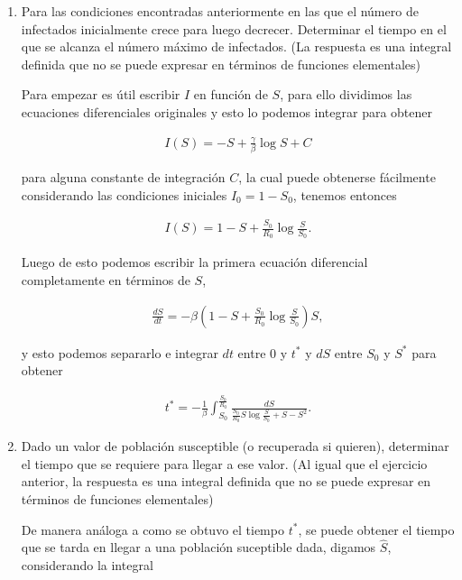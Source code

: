 \documentclass[answers]{exam}
\begin{document}
\begin{questions}
\begin{enumerate}
\begin{enumerate}
\item Para las condiciones encontradas anteriormente en las que el n\'umero de infectados inicialmente crece para luego decrecer. Determinar el tiempo en el que se alcanza el n\'umero m\'aximo de infectados. (La respuesta es una integral definida que no se puede expresar en t\'erminos de funciones elementales)

\begin{solution}
Para empezar es útil escribir $I$ en función de $S$, para ello dividimos las ecuaciones diferenciales originales y esto lo podemos integrar para obtener

\begin{align*}
    I(S) = -S + \frac{\gamma}{\beta}\log{S} + C
\end{align*}

para alguna constante de integración $C$, la cual puede obtenerse fácilmente considerando las condiciones iniciales $I_0 = 1 - S_0$, tenemos entonces

\begin{align*}
    I(S) = 1 - S + \frac{S_0}{R_0}\log{\frac{S}{S_0}}.
\end{align*}

Luego de esto podemos escribir la primera ecuación diferencial completamente en términos de $S$,

\begin{align*}
    \frac{dS}{dt} = -\beta\left(1 - S + \frac{S_0}{R_0}\log{\frac{S}{S_0}}\right)S,
\end{align*}

y esto podemos separarlo e integrar $dt$ entre $0$ y $t^*$ y $dS$ entre $S_0$ y $S^*$ para obtener

\begin{align*}
    t^* = -\frac{1}{\beta}\int_{S_0}^{\frac{S_0}{R_0}} \frac{dS}{\frac{S_0}{R_0}S\log{\frac{S}{S_0}} + S - S^2}.
\end{align*}
\end{solution}

\item Dado un valor de poblaci\'on susceptible (o recuperada si quieren), determinar el tiempo que se requiere para llegar a ese valor. (Al igual que el ejercicio anterior, la respuesta es una integral definida que no se puede expresar en t\'erminos de funciones elementales)

\begin{solution}
De manera análoga a como se obtuvo el tiempo $t^*$, se puede obtener el tiempo que se tarda en llegar a una población suceptible dada, digamos $\hat{S}$, considerando la integral


\end{solution}
\end{enumerate}
\end{enumerate}
\end{questions}
\end{document}
